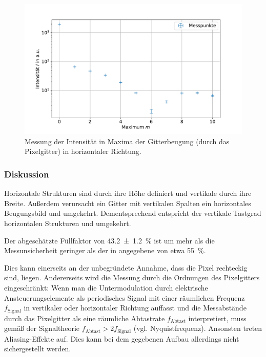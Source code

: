 \documentclass[
	a4paper,
	12pt,
	pagesize,
	ngerman
]{scrartcl}
\begin{document}
\begin{figure}[H] %
			\includegraphics[width=0.8\linewidth]{img/sinc2}
			\caption{
			Messung der Intensität in Maxima der Gitterbeugung (durch das Pixelgitter) in horizontaler Richtung.
			}
			\label{fig_sinc2}
	\end{figure}


			\subsubsection*{Diskussion}
			Horizontale Strukturen sind durch ihre Höhe definiert und vertikale durch ihre Breite.
			Außerdem verursacht ein Gitter mit vertikalen Spalten ein horizontales Beugungsbild und umgekehrt.
			Dementsprechend entspricht der vertikale Tastgrad horizontalen Strukturen und umgekehrt.

			Der abgeschätzte Füllfaktor von \SI{43,2\pm 1,2}{\percent} ist um mehr als die Messunsicherheit geringer als der in \cite{Handbuch} angegebene von etwa \SI{55}{\percent}.

			Dies kann einerseits an der unbegründete Annahme, dass die Pixel rechteckig sind, liegen.
			Andererseits wird die Messung durch die Ordnungen des Pixelgitters eingeschränkt:
			Wenn man die Untermodulation durch elektrische Ansteuerungselemente als periodisches Signal mit einer räumlichen Frequenz $ f_\text{Signal} $ in vertikaler oder horizontaler Richtung auffasst und die Messabstände durch das Pixelgitter als eine räumliche Abtastrate $f_\text{Abtast}$ interpretiert, muss gemäß der Signaltheorie $f_\text{Abtast} > 2 f_\text{Signal}$ (vgl. Nyquistfrequenz).
			Ansonsten treten Aliasing-Effekte auf.
			Dies kann bei dem gegebenen Aufbau allerdings nicht sichergestellt werden.
\end{document}
